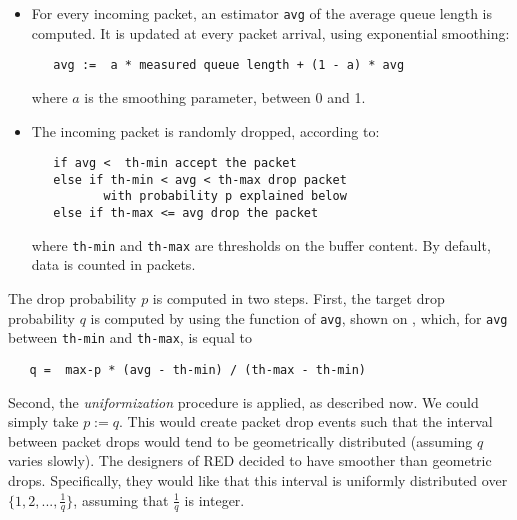 \begin{itemize}
        \item  For every incoming packet, an estimator \texttt{avg} of the average queue length is computed. It is
        updated at every packet arrival, using exponential
        smoothing:

 \begin{verbatim}
   avg :=  a * measured queue length + (1 - a) * avg
 \end{verbatim}
where $a$ is the smoothing parameter, between 0 and 1.
 \item The incoming packet is randomly dropped, according to:
 \begin{verbatim}
   if avg <  th-min accept the packet
   else if th-min < avg < th-max drop packet
          with probability p explained below
   else if th-max <= avg drop the packet
 \end{verbatim}
 where \texttt{th-min} and \texttt{th-max} are thresholds on the
 buffer content. By default, data is counted in packets.
\end{itemize}
The drop probability $p$ is computed in two steps. First, the target drop
probability $q$ is computed by using the function of \texttt{avg},
shown on , which, for \texttt{avg} between \texttt{th-min} and \texttt{th-max}, is equal to
\begin{verbatim}
   q =  max-p * (avg - th-min) / (th-max - th-min)
 \end{verbatim}
Second, the \emph{uniformization} procedure is applied, as described now. We could simply take $p:=q$. This would
create packet drop events such that the interval between packet drops would tend to be geometrically
distributed (assuming $q$ varies slowly). The designers of RED
decided to have smoother than geometric drops. Specifically, they would like that this interval is uniformly distributed over $\{1, 2,..., \frac{1}{q}\}$, assuming
that $\frac{1}{q}$ is integer.

